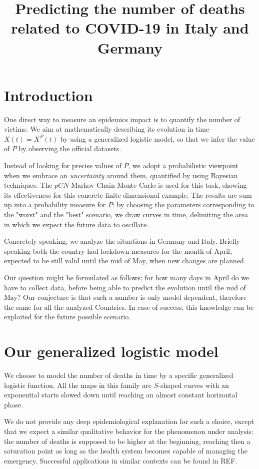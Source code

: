 \documentclass[8pt]{article}
\title {Predicting the number of deaths related 
to COVID-19 in Italy and Germany}
\begin{document}
\maketitle
\section{Introduction}
One direct way to measure an epidemics impact is to quantify the number 
of victims.
We aim at mathematically describing its evolution
in time $X(t) = X^P(t)$ by using a generalized logistic model, so that 
we infer the value of $P$ by observing the official datasets.


Instead of looking for precise values of $P$, we adopt a probabilistic
viewpoint when we embrace an \emph{uncertainty} around them, quantified
by using Bayesian techniques. The $pCN$ Markov Chain Monte Carlo is used
for this task, showing its effectiveness for this concrete finite
dimensional example. The results are sum up into a probability
measure for $P$: by choosing the parameters corresponding
to the "worst" and the "best" scenario, we draw curves in time, delimiting the
area in which we expect the future data to oscillate.


Concretely speaking, we analyze the situations in Germany and Italy.
Briefly speaking both the country had lockdown measures for the month
of April, expected to be still valid until the mid of May, when new
changes are planned.


Our question might be formulated as follows:
for how many days in April do we have to collect data,
before being able to predict the evolution until the mid of May? 
Our conjecture is that such a number is only
model dependent, therefore the same for all
the analyzed Countries. In case of success, this knowledge can be
exploited for the future possible scenario.



\section {Our generalized logistic model}
We choose to model the number of deaths in time by a 
specific generalized logistic function. 
All the maps in this family are
 $S$-shaped curves with an exponential starts
slowed down until reaching an almost constant horizontal phase. 


We do not provide any deep epidemiological explanation for such a choice,
except that we expect a similar qualitative behavior for the phenomenon
under analysis: the number of deaths is supposed to be higher at the beginning,
reaching then a saturation point as long as the health system becomes
capable of managing the emergency.
Successful applications in similar contexts can be found in REF.
\end{document}
